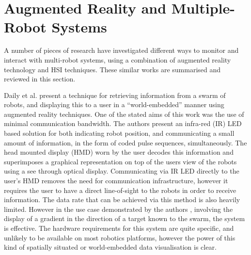 \section{Augmented Reality and Multiple-Robot Systems} \label{SimilarWork}
A number of pieces of research have investigated different ways to monitor and interact with multi-robot systems, using a combination of augmented reality technology and HSI techniques. These similar works are summarised and reviewed in this section.

Daily et al. \cite{Daily:2003} present a technique for retrieving information from a swarm of robots, and displaying this to a user in a ``world-embedded'' manner using augmented reality techniques. One of the stated aims of this work was the use of minimal communication bandwidth. The authors present \cite{Daily:2003} an infra-red (IR) LED based solution for both indicating robot position, and communicating a small amount of information, in the form of coded pulse sequences, simultaneously. The head mounted display (HMD) worn by the user decodes this information and superimposes a graphical representation on top of the users view of the robots using a see through optical display. Communicating via IR LED directly to the user's HMD removes the need for communication infrastructure, however it requires the user to have a direct line-of-sight to the robots in order to receive information. The data rate that can be achieved via this method is also heavily limited. However in the use case demonstrated by the authors \cite{Daily:2003}, involving the display of a gradient in the direction of a target known to the swarm, the system is effective. The hardware requirements for this system are quite specific, and unlikely to be available on most robotics platforms, however the power of this kind of spatially situated or world-embedded data visualisation is clear.

